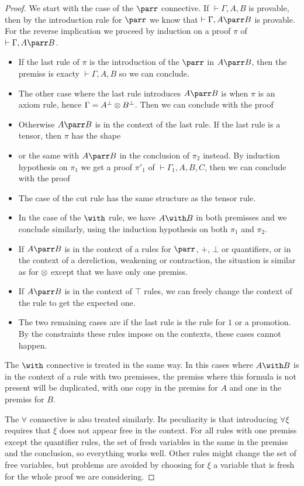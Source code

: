 \begin{proof}
We start with the case of the $\parr$ connective.
If $\vdash\Gamma,A,B$ is provable, then by the introduction rule for $\parr$
we know that $\vdash\Gamma,A\parr B$ is provable.
For the reverse implication we proceed by induction on a proof $\pi$ of
$\vdash\Gamma,A\parr B$.
\begin{itemize}
\item If the last rule of $\pi$ is the introduction of the $\parr$ in $A\parr B$, then the premiss is exacty $\vdash\Gamma,A,B$ so we can conclude.
\item The other case where the last rule introduces $A\parr B$ is when $\pi$ is an axiom rule, hence $\Gamma=A^\bot\otimes B^\bot$. Then we can conclude with the proof
\item Otherwise $A\parr B$ is in the context of the last rule. If the last rule is a tensor, then $\pi$ has the shape
\item or the same with $A\parr B$ in the conclusion of $\pi_2$ instead. By induction hypothesis on $\pi_1$ we get a proof $\pi'_1$ of $\vdash\Gamma_1,A,B,C$, then we can conclude with the proof
\item The case of the cut rule has the same structure as the tensor rule.
\item In the case of the $\with$ rule, we have $A\with B$ in both premisses and we conclude similarly, using the induction hypothesis on both $\pi_1$ and $\pi_2$.
\item If $A\parr B$ is in the context of a rules for $\parr$, $\plus$, $\bot$ or quantifiers, or in the context of a dereliction, weakening or contraction, the situation is similar as for $\otimes$ except that we have only one premiss.
\item If $A\parr B$ is in the context of $\top$ rules, we can freely change the context of the rule to get the expected one.
\item The two remaining cases are if the last rule is the rule for $1$ or a promotion. By the constraints these rules impose on the contexts, these cases cannot happen.
\end{itemize}
The $\with$ connective is treated in the same way.
In this cases where $A\with B$ is in the context of a rule with two
premisses, the premiss where this formula is not present will be duplicated,
with one copy in the premiss for $A$ and one in the premiss for $B$.

The $\forall$ connective is also treated similarly.
Its peculiarity is that introducing $\forall\xi$ requires that $\xi$ does
not appear free in the context.
For all rules with one premiss except the quantifier rules, the set of fresh
variables in the same in the premiss and the conclusion, so everything works
well.
Other rules might change the set of free variables, but problems are avoided
by choosing for $\xi$ a variable that is fresh for the whole proof we are considering.
\end{proof}

